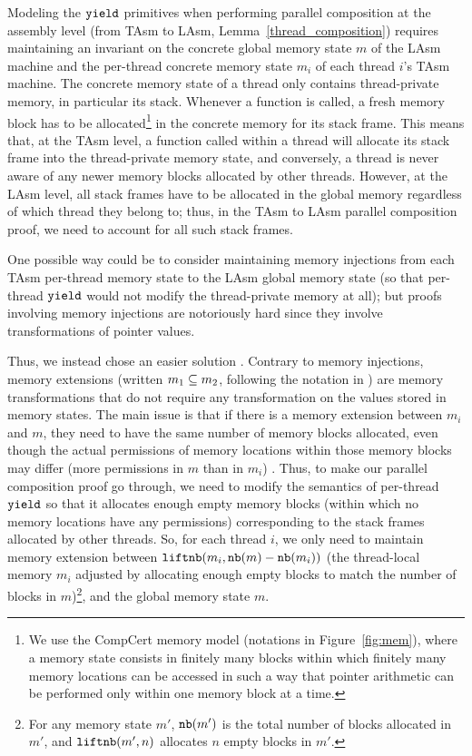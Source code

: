 Modeling the ${\texttt{yield}}$ primitives when performing parallel
composition at the assembly level (from TAsm to LAsm, Lemma~\ref{thread_composition}) requires
maintaining an invariant on the concrete global memory state $m$ of
the LAsm machine and the per-thread concrete memory state $m_i$ of
each thread $i$'s TAsm machine. The concrete memory state of a thread
only contains thread-private memory, in particular its stack. Whenever
a function is called, a fresh memory block has to be allocated\footnote{We use the CompCert memory model \cite{leroy08}(notations in Figure~\ref{fig:mem}), where a memory state consists in finitely many blocks within which finitely many memory locations can be accessed in such a way that pointer arithmetic can be performed only within one memory block at a time.} in the
concrete memory for its stack frame. This means that, at the TAsm
level, a function called within a thread will allocate its stack frame
into the thread-private memory state, and conversely, a thread is
never aware of any newer memory blocks allocated by other
threads. However, at the LAsm level, all stack frames have to be allocated
in the global memory regardless of which thread they belong to;
thus, in the TAsm to LAsm parallel composition proof, we need to account
for all such stack frames.

One possible way could be to consider maintaining memory injections
from each TAsm per-thread memory state to the LAsm global memory state
(so that per-thread ${\texttt{yield}}$ would not modify the thread-private
memory at all); but proofs involving memory injections are notoriously
hard since they involve transformations of pointer values.

Thus, we instead chose an easier solution \cite[\S 5.2]{leroy08}. Contrary to memory injections,
memory extensions (written ${m_1} \subseteq {m_2}$, following the
notation in \cite[\S 5.2]{leroy08}) are memory transformations that do
not require any transformation on the values
stored in memory states. The main issue is that if there is a memory
extension between $m_i$ and $m$, they need to have the same number of
memory blocks allocated, even though the actual permissions of memory
locations within those memory blocks may differ (more permissions in
$m$ than in $m_i$) \cite{compcert-mem-v2}. Thus, to make our parallel composition proof go
through, we need to modify the semantics of per-thread ${\texttt{yield}}$ so
that it allocates enough empty memory blocks (within which no memory
locations have any permissions) corresponding to the stack frames
allocated by other threads. So, for each thread $i$, we only need to
maintain memory extension between ${\texttt{liftnb}}({m_i}, {{\texttt{nb}}({m}) -
{\texttt{nb}}({m_i})})$ (the thread-local memory $m_i$ adjusted by
allocating enough empty blocks to match the number of blocks in $m$)\footnote{For any memory state $m'$,
${\texttt{nb}}({m'})$ is the total number of blocks allocated in $m'$, and
${\texttt{liftnb}}({m'}, {n})$ allocates $n$ empty blocks in $m'$.},
and the global memory state $m$.

